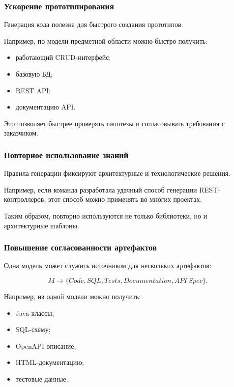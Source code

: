 \documentclass[12pt,a4paper]{article}
\begin{document}
\subsubsection{Ускорение прототипирования}

Генерация кода полезна для быстрого создания прототипов.

Например, по модели предметной области можно быстро получить:

\begin{itemize}
    \item работающий CRUD-интерфейс;
    \item базовую БД;
    \item REST API;
    \item документацию API.
\end{itemize}

Это позволяет быстрее проверять гипотезы и согласовывать требования с заказчиком.

\subsubsection{Повторное использование знаний}

Правила генерации фиксируют архитектурные и технологические решения.

Например, если команда разработала удачный способ генерации REST-контроллеров, этот способ можно применять во многих проектах.

Таким образом, повторно используются не только библиотеки, но и архитектурные шаблоны.

\subsubsection{Повышение согласованности артефактов}

Одна модель может служить источником для нескольких артефактов:

\[
    M \longrightarrow \{Code, SQL, Tests, Documentation, API\ Spec\}.
\]

Например, из одной модели можно получить:

\begin{itemize}
    \item Java-классы;
    \item SQL-схему;
    \item OpenAPI-описание;
    \item HTML-документацию;
    \item тестовые данные.
\end{itemize}
\end{document}
